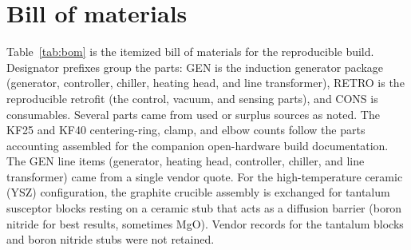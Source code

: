 \documentclass[10pt,letterpaper]{article}
\begin{document}
\clearpage
\section{Bill of materials}

Table~\ref{tab:bom} is the itemized bill of materials for the reproducible
build. Designator prefixes group the parts: GEN is the induction generator
package (generator, controller, chiller, heating head, and line
transformer), RETRO is the reproducible retrofit (the control, vacuum, and
sensing parts), and CONS is consumables. Several parts came from used or
surplus sources as noted. The KF25 and
KF40 centering-ring, clamp, and elbow counts follow the parts accounting
assembled for the companion open-hardware build documentation. The GEN line
items (generator, heating head, controller, chiller, and line transformer)
came from a single vendor quote. For the
high-temperature ceramic (YSZ) configuration, the graphite crucible assembly
is exchanged for tantalum susceptor blocks resting on a ceramic stub that
acts as a diffusion barrier (boron nitride for best results, sometimes MgO).
Vendor records for the tantalum blocks and boron nitride stubs were not
retained.
\end{document}
